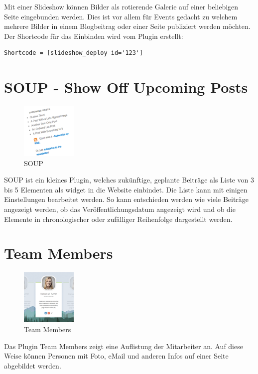 \documentclass[a4paper,11pt,twoside,titlepage,openright]{report}
\numberwithin{equation}{section}		%
\numberwithin{figure}{section}			%
\numberwithin{table}{section}				%
\begin{document}
Mit einer Slideshow können Bilder als rotierende Galerie auf einer beliebigen Seite eingebunden werden. Dies ist vor allem für Events gedacht zu welchem mehrere Bilder in einem Blogbeitrag oder einer Seite publiziert werden möchten. Der Shortcode für das Einbinden wird vom Plugin erstellt:

\lstset{language=html}
\begin{lstlisting}[frame=single]
Shortcode = [slideshow_deploy id='123']
\end{lstlisting}

\section{SOUP - Show Off Upcoming Posts}

\begin{figure}
\vspace{-20pt}
\centering
\includegraphics[width=100px]{Images/soup.png}
\caption{SOUP}
\vspace{-10pt}
\end{figure}

SOUP ist ein kleines Plugin, welches zukünftige, geplante Beiträge als Liste von 3 bis 5 Elementen als \gls{widget} in die Website einbindet. Die Liste kann mit einigen Einstellungen bearbeitet werden. So kann entschieden werden wie viele Beiträge angezeigt werden, ob das Veröffentlichungsdatum angezeigt wird und ob die Elemente in chronologischer oder zufälliger Reihenfolge dargestellt werden.

\section{Team Members}
\begin{figure}
\vspace{-20pt}
\centering
\includegraphics[width=100px]{Images/Team_Members.png}
\caption{Team Members}
\end{figure}
Das Plugin Team Members zeigt eine Auflistung der Mitarbeiter an. Auf diese Weise können Personen mit Foto, eMail und anderen Infos auf einer Seite abgebildet werden.
\end{document}

